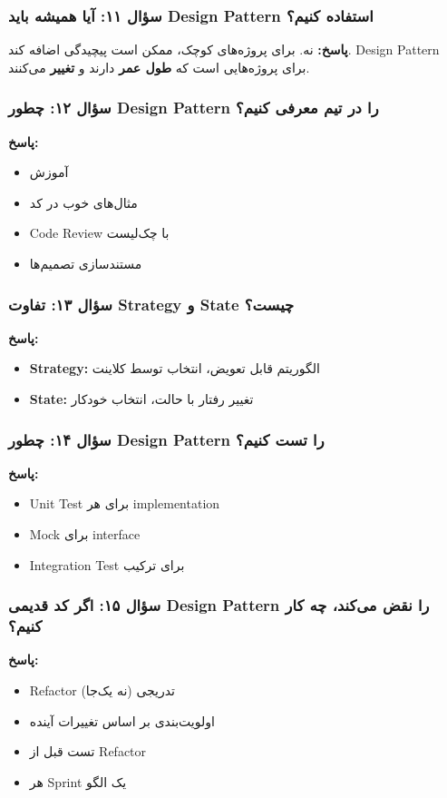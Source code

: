 \documentclass[12pt, a4paper]{article}
\begin{document}
\subsubsection{سؤال ۱۱: آیا همیشه باید Design Pattern استفاده کنیم؟}
\textbf{پاسخ:} نه. برای پروژه‌های کوچک، ممکن است پیچیدگی اضافه کند. Design 
Pattern برای پروژه‌هایی است که \textbf{طول عمر} دارند و \textbf{تغییر} 
می‌کنند.

\subsubsection{سؤال ۱۲: چطور Design Pattern را در تیم معرفی کنیم؟}
\textbf{پاسخ:}
\begin{itemize}
    \item آموزش
    \item مثال‌های خوب در کد
    \item Code Review با چک‌لیست
    \item مستندسازی تصمیم‌ها
\end{itemize}

\subsubsection{سؤال ۱۳: تفاوت Strategy و State چیست؟}
\textbf{پاسخ:}
\begin{itemize}
    \item \textbf{Strategy:} الگوریتم قابل تعویض، انتخاب توسط کلاینت
    \item \textbf{State:} تغییر رفتار با حالت، انتخاب خودکار
\end{itemize}

\subsubsection{سؤال ۱۴: چطور Design Pattern را تست کنیم؟}
\textbf{پاسخ:}
\begin{itemize}
    \item Unit Test برای هر implementation
    \item Mock برای interface
    \item Integration Test برای ترکیب
\end{itemize}

\subsubsection{سؤال ۱۵: اگر کد قدیمی Design Pattern را نقض می‌کند، چه کار 
کنیم؟}
\textbf{پاسخ:}
\begin{itemize}
    \item Refactor تدریجی (نه یک‌جا)
    \item اولویت‌بندی بر اساس تغییرات آینده
    \item تست قبل از Refactor
    \item هر Sprint یک الگو
\end{itemize}
\end{document}
